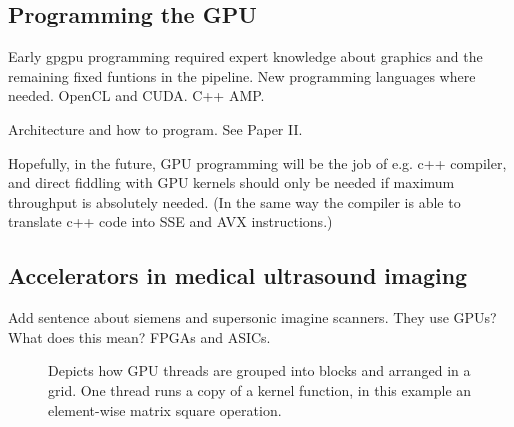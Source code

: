 \subsection{Programming the GPU}
Early gpgpu programming required expert knowledge about graphics and the remaining fixed funtions in the pipeline. New programming languages where needed. OpenCL and CUDA. C++ AMP.

Architecture and how to program. See Paper II.

Hopefully, in the future, GPU programming will be the job of e.g. c++ compiler, and direct fiddling with GPU kernels should only be needed if maximum throughput is absolutely needed. (In the same way the compiler is able to translate c++ code into SSE and AVX instructions.)

\subsection{Accelerators in medical ultrasound imaging }
Add sentence about siemens and supersonic imagine scanners. They use GPUs? What does this mean? FPGAs and ASICs.

\begin{figure}
\centering
{}
\caption{Depicts how GPU threads are grouped into blocks and arranged in a grid. One thread runs a copy of a kernel function, in this example an element-wise matrix square operation.}
\label{fig:gpu_grid}
\end{figure}

